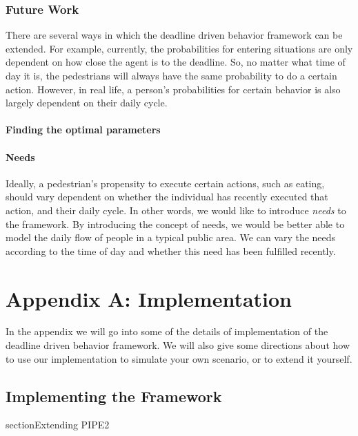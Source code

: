 \documentclass[11pt]{book}
\begin{document}
\subsection{Future Work}
There are several ways in which the deadline driven behavior framework can be extended. For example, currently, the probabilities for entering situations are only dependent on how close the agent is to the deadline. So, no matter what time of day it is, the pedestrians will always have the same probability to do a certain action. However, in real life, a person's probabilities for certain behavior is also largely dependent on their daily cycle.

\subsubsection{Finding the optimal parameters}

\subsubsection{Needs}
Ideally, a pedestrian's propensity to execute certain actions, such as eating, should vary dependent on whether the individual has recently executed that action, and their daily cycle. In other words, we would like to introduce \emph{needs} to the framework. By introducing the concept of needs, we would be better able to model the daily flow of people in a typical public area. We can vary the needs according to the time of day and whether this need has been fulfilled recently.

\appendix

\chapter{Appendix A: Implementation}
In the appendix we will go into some of the details of implementation of the deadline driven behavior framework. We will also give some directions about how to use our implementation to simulate your own scenario, or to extend it yourself.


\section{Implementing the Framework}


section{Extending PIPE2}
\end{document}

